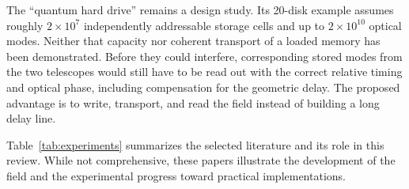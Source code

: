 \documentclass[]{spie}
\begin{document}
The ``quantum hard drive'' remains a design study. Its 20-disk example assumes roughly $2\times10^7$ independently addressable storage cells and up to $2\times10^{10}$ optical modes. Neither that capacity nor coherent transport of a loaded memory has been demonstrated. Before they could interfere, corresponding stored modes from the two telescopes would still have to be read out with the correct relative timing and optical phase, including compensation for the geometric delay. The proposed advantage is to write, transport, and read the field instead of building a long delay line.

\FloatBarrier
Table~\ref{tab:experiments} summarizes the selected literature and its role in this review. While not comprehensive, these papers illustrate the development of the field and the experimental progress toward practical implementations.
\end{document}
